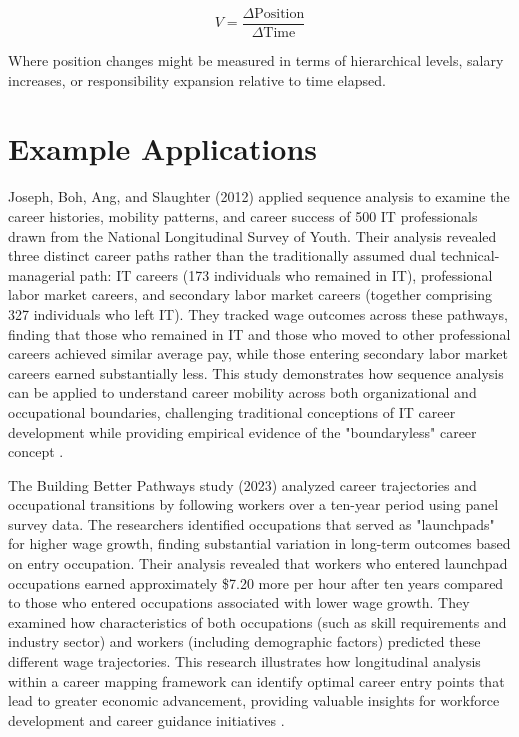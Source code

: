 \documentclass{article}
\begin{document}
\[ V = \frac{\Delta \text{Position}}{\Delta \text{Time}} \]

Where position changes might be measured in terms of hierarchical levels, salary increases, or responsibility expansion relative to time elapsed.

\section{Example Applications}

Joseph, Boh, Ang, and Slaughter (2012) applied sequence analysis to examine the career histories, mobility patterns, and career success of 500 IT professionals drawn from the National Longitudinal Survey of Youth. Their analysis revealed three distinct career paths rather than the traditionally assumed dual technical-managerial path: IT careers (173 individuals who remained in IT), professional labor market careers, and secondary labor market careers (together comprising 327 individuals who left IT). They tracked wage outcomes across these pathways, finding that those who remained in IT and those who moved to other professional careers achieved similar average pay, while those entering secondary labor market careers earned substantially less. This study demonstrates how sequence analysis can be applied to understand career mobility across both organizational and occupational boundaries, challenging traditional conceptions of IT career development while providing empirical evidence of the "boundaryless" career concept \citep{joseph2012}.

The Building Better Pathways study (2023) analyzed career trajectories and occupational transitions by following workers over a ten-year period using panel survey data. The researchers identified occupations that served as "launchpads" for higher wage growth, finding substantial variation in long-term outcomes based on entry occupation. Their analysis revealed that workers who entered launchpad occupations earned approximately \$7.20 more per hour after ten years compared to those who entered occupations associated with lower wage growth. They examined how characteristics of both occupations (such as skill requirements and industry sector) and workers (including demographic factors) predicted these different wage trajectories. This research illustrates how longitudinal analysis within a career mapping framework can identify optimal career entry points that lead to greater economic advancement, providing valuable insights for workforce development and career guidance initiatives \citep{workforcegps2023}.
\end{document}
